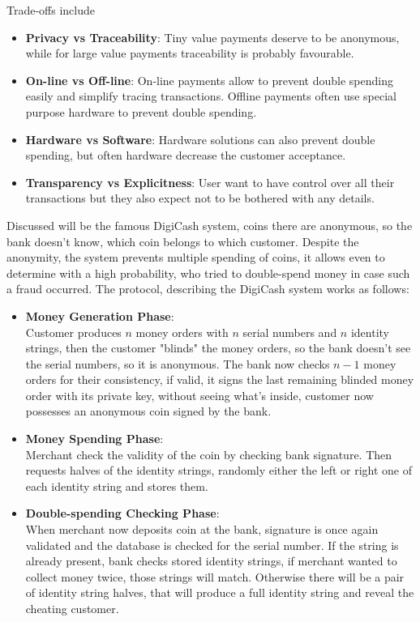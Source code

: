 \documentclass[a4paper, 10 pt, conference]{ieeeconf}
\begin{document}
Trade-offs include \label{tex:tradeoff}
\begin{itemize}
\item \textbf{Privacy vs Traceability}: Tiny value payments deserve to be anonymous, while for large value payments traceability is probably favourable. 
\item \textbf{On-line vs Off-line}: On-line payments allow to prevent double spending easily and simplify tracing transactions. Offline payments often use special purpose hardware to prevent double spending.
\item \textbf{Hardware vs Software}: Hardware solutions can also prevent double spending, but often hardware decrease the customer acceptance. 
\item \textbf{Transparency vs Explicitness}: User want to have control over all their transactions but they also expect not to be bothered with any details. 
\end{itemize}
\vspace{0.5cm}
Discussed will be the famous DigiCash system, coins there are anonymous, so the bank doesn't know, which coin belongs to which customer. Despite the anonymity, the system prevents multiple spending of coins, it allows even to determine with a high probability, who tried to double-spend money in case such a fraud occurred. 
\pagebreak
The protocol, describing the DigiCash system works as follows:
\begin{itemize}
\item \textbf{Money Generation Phase}:\\ Customer produces $n$ money orders with $n$ serial numbers and $n$ identity strings, then the customer "blinds" the money orders, so the bank doesn't see the serial numbers, so it is anonymous. The bank now checks $n-1$ money orders for their consistency, if valid, it signs the last remaining blinded money order with its private key, without seeing what's inside, customer now possesses an anonymous coin signed by the bank.
\item \textbf{Money Spending Phase}: \\
Merchant check the validity of the coin by checking bank signature. Then requests halves of the identity strings, randomly either the left or right one of each identity string and stores them.
\item \textbf{Double-spending Checking Phase}: \\
When merchant now deposits coin at the bank, signature is once again validated and the database is checked for the serial number. If the string is already present, bank checks stored identity strings, if merchant wanted to collect money twice, those strings will match. Otherwise there will be a pair of identity string halves, that will produce a full identity string and reveal the cheating customer. 
\end{itemize}
\end{document}
